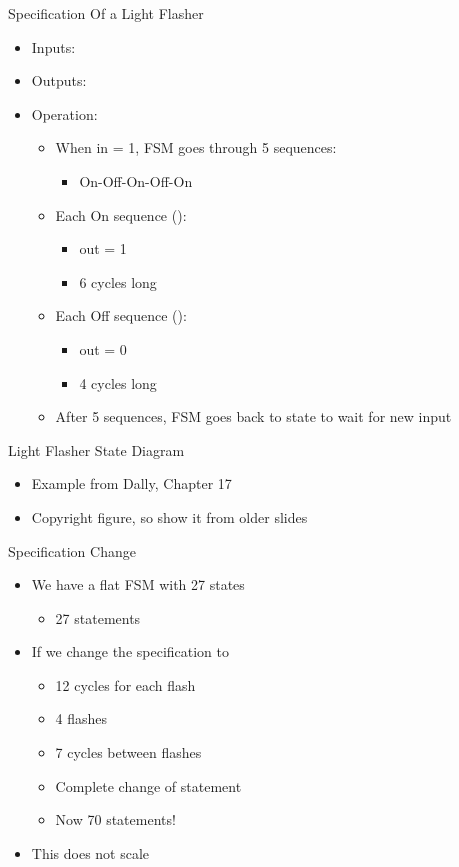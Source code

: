 \begin{frame}[fragile]{Specification Of a Light Flasher}
\begin{itemize}
\item Inputs: 
\item Outputs: 
\item Operation:
\begin{itemize}
\item When in = 1, FSM goes through 5 sequences:
\begin{itemize}
\item On-Off-On-Off-On
\end{itemize}
\item Each On sequence ():
\begin{itemize}
\item out = 1
\item 6 cycles long
\end{itemize}
\item Each Off sequence ():
\begin{itemize}
\item out = 0
\item 4 cycles long
\end{itemize}
\item After 5 sequences, FSM goes back to  state to wait for new input
\end{itemize}
\end{itemize}
\end{frame}

\begin{frame}[fragile]{Light Flasher State Diagram}
\begin{itemize}
\item Example from Dally, Chapter 17
\item Copyright figure, so show it from older slides
\end{itemize}
\end{frame}

\begin{frame}[fragile]{Specification Change}
\begin{itemize}
\item We have a flat FSM with 27 states
\begin{itemize}
\item 27  statements
\end{itemize}
\item If we change the specification to
\begin{itemize}
\item 12 cycles for each flash
\item 4 flashes
\item 7 cycles between flashes
\item Complete change of  statement
\item Now 70  statements!
\end{itemize}
\item This does not scale
\end{itemize}
\end{frame}

